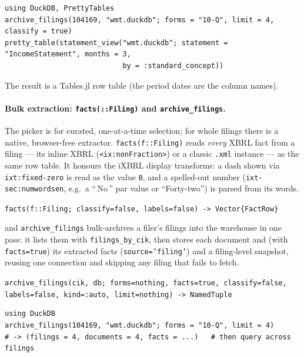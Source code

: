 \documentclass[11pt,a4paper]{report}
\newcommand{\sig}[1]{\medskip\noindent\texttt{#1}\par\medskip}
\begin{document}
\begin{lstlisting}
using DuckDB, PrettyTables
archive_filings(104169, "wmt.duckdb"; forms = "10-Q", limit = 4, classify = true)
pretty_table(statement_view("wmt.duckdb"; statement = "IncomeStatement", months = 3,
                            by = :standard_concept))
\end{lstlisting}

\noindent The result is a Tables.jl row table (the period dates are the column names).

\paragraph{Bulk extraction: \texttt{facts(::Filing)} and \texttt{archive\_filings}.} The picker
is for curated, one-at-a-time selection; for whole filings there is a native, browser-free
extractor. \texttt{facts(f::Filing)} reads \emph{every} XBRL fact from a filing --- its inline
XBRL (\texttt{<ix:nonFraction>}) or a classic \texttt{.xml} instance --- as the same row table.
It honours the iXBRL display transforms: a dash shown via \texttt{ixt:fixed-zero} is read as the
value \texttt{0}, and a spelled-out number (\texttt{ixt-sec:numwordsen}, e.g.\ a ``\,No\,'' par
value or ``Forty-two'') is parsed from its words.

\sig{facts(f::Filing; classify=false, labels=false) -> Vector\{FactRow\}}

\noindent and \texttt{archive\_filings} bulk-archives a filer's filings into the warehouse in
one pass: it lists them with \texttt{filings\_by\_cik}, then stores each document and (with
\texttt{facts=true}) its extracted facts (\texttt{source='filing'}) and a filing-level snapshot,
reusing one connection and skipping any filing that fails to fetch.

\sig{archive\_filings(cik, db; forms=nothing, facts=true, classify=false, labels=false, kind=:auto, limit=nothing) -> NamedTuple}

\begin{lstlisting}
using DuckDB
archive_filings(104169, "wmt.duckdb"; forms = "10-Q", limit = 4)
# -> (filings = 4, documents = 4, facts = ...)   # then query across filings
\end{lstlisting}
\end{document}
